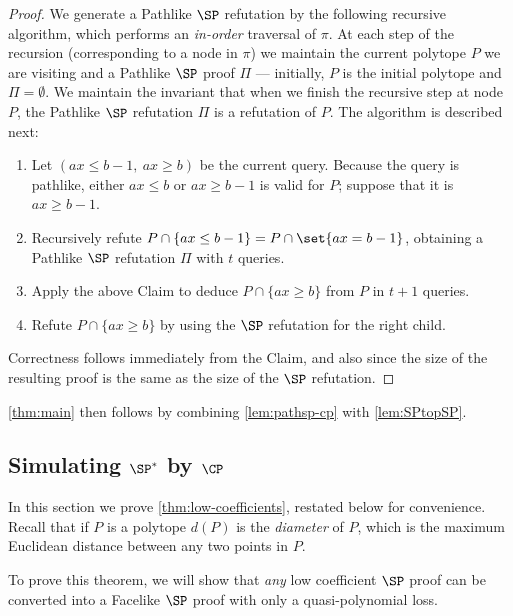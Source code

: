 \documentclass[11pt]{article}
\begin{document}
\begin{proof}
	We generate a Pathlike $\SP$ refutation by the following recursive algorithm, which performs an \emph{in-order} traversal of $\pi$. 
	At each step of the recursion (corresponding to a node in $\pi$) we maintain the current polytope $P$ we are visiting and a Pathlike $\SP$ proof $\Pi$ --- initially, $P$ is the initial polytope and $\Pi = \emptyset$. 
	We maintain the invariant that when we finish the recursive step at node $P$, the Pathlike $\SP$ refutation $\Pi$ is a refutation of $P$. 
	The algorithm is described next:
	\begin{enumerate}
		\item Let $(ax \leq b-1,~ ax \geq b)$ be the current query. Because the query is pathlike, either $ax \leq b$ or $ax \geq b-1$ is valid for $P$; suppose that it is $ax \geq b-1$. 
		\item Recursively refute $P \cap \{ ax \leq b-1\} = P \cap \set{ax = b-1}$, obtaining a Pathlike $\SP$ refutation $\Pi$ with $t$ queries. 
		\item Apply the above Claim to deduce $P \cap \{ax \geq b\}$ from $P$ in $t+1$ queries. 
		\item Refute $P \cap \{ ax \geq b\}$ by using the $\SP$ refutation for the right child. 
	\end{enumerate}
	Correctness follows immediately from the Claim, and also since the size of the resulting proof is the same as the size of the $\SP$ refutation. 		
	\end{proof}
	
	\autoref{thm:main} then follows by combining \autoref{lem:pathsp-cp} with \autoref{lem:SPtopSP}.


\subsection{Simulating \texorpdfstring{$\SP^*$}{SP*} by
          \texorpdfstring{$\CP$}{CP}}
\label{sec:quasipoly-simulation}
In this section we prove \autoref{thm:low-coefficients}, restated below for convenience.
Recall that if $P$ is a polytope $d(P)$ is the \emph{diameter} of $P$, which is the maximum Euclidean distance between any two points in $P$.

\lowcoefficients*

To prove this theorem, we will show that \emph{any} low coefficient $\SP$ proof can be converted into a Facelike $\SP$ proof with only a quasi-polynomial loss. 
\end{document}
